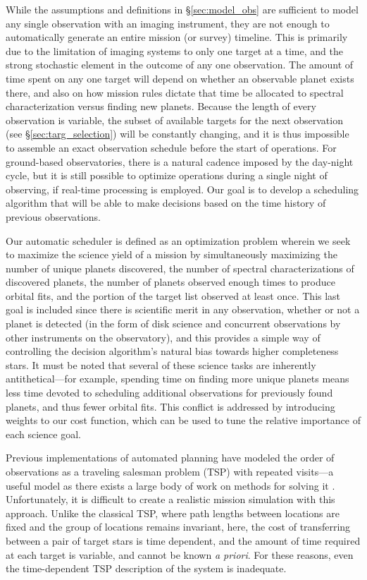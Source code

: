 While the assumptions and definitions in \S\ref{sec:model_obs} are sufficient to model any single observation with an imaging instrument, they are not enough to automatically generate an entire mission (or survey) timeline.  This is primarily due to the limitation of imaging systems to only one target at a time, and the strong stochastic element in the outcome of any one observation.  The amount of time spent on any one target will depend on whether an observable planet exists there, and also on how mission rules dictate that time be allocated to spectral characterization versus finding new planets.  Because the length of every observation is variable, the subset of available targets for the next observation (see \S\ref{sec:targ_selection}) will be constantly changing, and it is thus impossible to assemble an exact observation schedule before the start of operations.  For ground-based observatories, there is a natural cadence imposed by the day-night cycle, but it is still possible to optimize operations during a single night of observing, if real-time processing is employed.  Our goal is to develop a scheduling algorithm that will be able to make decisions based on the time history of previous observations.

Our automatic scheduler is defined as an optimization problem wherein we seek to maximize the science yield of a mission by simultaneously maximizing the number of unique planets discovered, the number of spectral characterizations of discovered planets, the number of planets observed enough times to produce orbital fits, and the portion of the target list observed at least once.  This last goal is included since there is scientific merit in any observation, whether or not a planet is detected (in the form of disk science and concurrent observations by other instruments on the observatory), and this provides a simple way of controlling the decision algorithm's natural bias towards higher completeness stars.  It must be noted that several of these science tasks are inherently antithetical---for example, spending time on finding more unique planets means less time devoted to scheduling additional observations for previously found planets, and thus fewer orbital fits.  This conflict is addressed by introducing weights to our cost function, which can be used to tune the relative importance of each science goal.

 Previous implementations of automated planning have modeled the order of observations as a traveling salesman problem (TSP) with repeated visits---a useful model as there exists a large body of work on methods for solving it \citep{kolemen2007}. Unfortunately, it is difficult to create a realistic mission simulation with this approach.  Unlike the classical TSP, where path lengths between locations are fixed and the group of locations remains invariant, here, the cost of transferring between a pair of target stars is time dependent, and the amount of time required at each target is variable, and cannot be known \emph{a priori}.  For these reasons, even the time-dependent TSP description of the system is inadequate.

